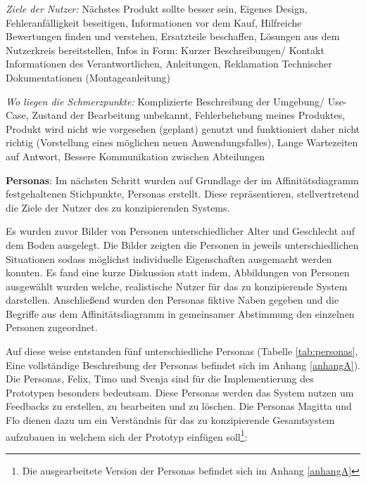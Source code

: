 \vspace{2mm}
\textit{Ziele der Nutzer: } 
Nächstes Produkt sollte besser sein, Eigenes Design, Fehleranfälligkeit beseitigen, Informationen vor dem Kauf, Hilfreiche Bewertungen finden und verstehen, Ersatzteile beschaffen, Lösungen aus dem Nutzerkreis bereitstellen, Infos in Form: Kurzer Beschreibungen/ Kontakt Informationen des Verantwortlichen, Anleitungen, Reklamation Technischer Dokumentationen (Montageanleitung)

\vspace{2mm}
\textit{Wo liegen die Schmerzpunkte: } 
Komplizierte Beschreibung der Umgebung/ Use-Case, Zustand der Bearbeitung unbekannt, Fehlerbehebung meines Produktes, Produkt wird nicht wie vorgesehen (geplant) genutzt und funktioniert daher nicht richtig (Vorstellung eines möglichen neuen Anwendungsfalles), Lange Wartezeiten auf Antwort, Bessere Kommunikation zwischen Abteilungen

\textbf{Personas}:
Im nächsten Schritt wurden auf Grundlage der im  Affinitätsdiagramm festgehaltenen Stichpunkte, Personas erstellt. Diese repräsentieren, stellvertretend die Ziele der 
Nutzer des zu konzipierenden Systems. 

Es wurden zuvor Bilder von Personen unterschiedlicher Alter und Geschlecht auf dem Boden ausgelegt. Die Bilder zeigten die Personen in jeweils unterschiedlichen Situationen 
sodass möglichst individuelle Eigenschaften ausgemacht werden konnten. Es fand eine kurze Diskussion statt indem, Abbildungen von Personen ausgewählt wurden welche, realistische 
Nutzer für das zu konzipierende System darstellen. Anschließend wurden den Personas fiktive Naben gegeben und die Begriffe aus dem Affinitätsdiagramm in gemeinsamer 
Abstimmung den einzelnen Personen zugeordnet. 

Auf diese weise entstanden fünf unterschiedliche Personas (Tabelle \ref{tab:personas}, Eine vollständige Beschreibung der Personas befindet sich im Anhang \ref{anhangA}). 
Die Personas, Felix, Timo und Svenja sind für die Implementierung des Prototypen besonders bedeutsam. Diese Personas werden das System nutzen um Feedbacks zu erstellen, 
zu bearbeiten und zu löschen. Die Personas Magitta und Flo dienen dazu um ein Verständnis für das zu konzipierende Gesamtsystem aufzubauen in welchem sich der Prototyp 
einfügen soll\footnote{Die ausgearbeitete Version der Personas befindet sich im Anhang \ref{anhangA}}: 

